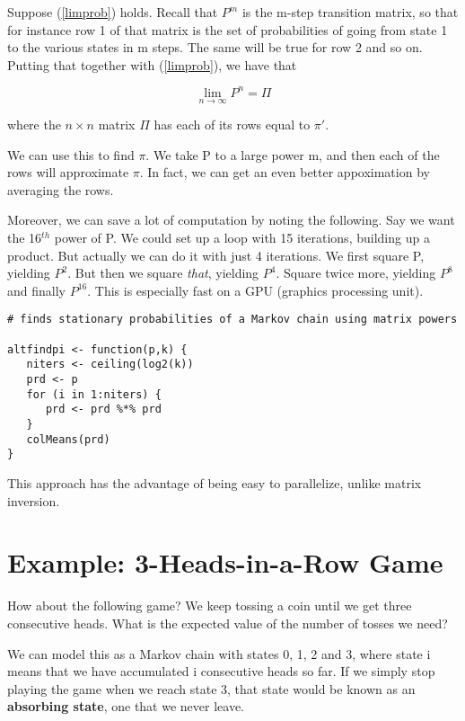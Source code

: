 Suppose (\ref{limprob}) holds.  Recall that $P^m$ is the m-step
transition matrix, so that for instance row 1 of that matrix is the set
of probabilities of going from state 1 to the various states in m steps.
The same will be true for row 2 and so on.  Putting that together with
(\ref{limprob}), we have that 

\begin{equation}
\lim_{n \rightarrow \infty} P^n = \Pi
\end{equation}

where the $n \times n$ matrix $\Pi$ has each of its rows equal to
$\pi'$. 

We can use this to find $\pi$.  We take P to a large power m, and then
each of the rows will approximate $\pi$.  In fact, we can get an even
better appoximation by averaging the rows.

Moreover, we can save a lot of computation by noting the following.  Say
we want the 16$^{th}$ power of P.  We could set up a loop with 15
iterations, building up a product.  But actually we can do it with just
4 iterations.  We first square P, yielding $P^2$.  But then we square
{\it that}, yielding $P^4$.  Square twice more, yielding $P^8$ and
finally $P^{16}$.  This is especially fast on a GPU (graphics processing
unit).

\begin{lstlisting}
# finds stationary probabilities of a Markov chain using matrix powers

altfindpi <- function(p,k) {
   niters <- ceiling(log2(k))
   prd <- p
   for (i in 1:niters) {
      prd <- prd %*% prd
   }
   colMeans(prd) 
}
\end{lstlisting}

This approach has the advantage of being easy to parallelize, unlike
matrix inversion.

\section{Example:  3-Heads-in-a-Row Game}
\label{threeinrow}

How about the following game?  We keep tossing a coin until we get three
consecutive heads.  What is the expected value of the number of tosses
we need?

We can model this as a Markov chain with states 0, 1, 2 and 3, where
state i means that we have accumulated i consecutive heads so far. 
If we simply stop playing the game when we reach state 3, that state
would be known as an {\bf absorbing state}, one that we never leave.


